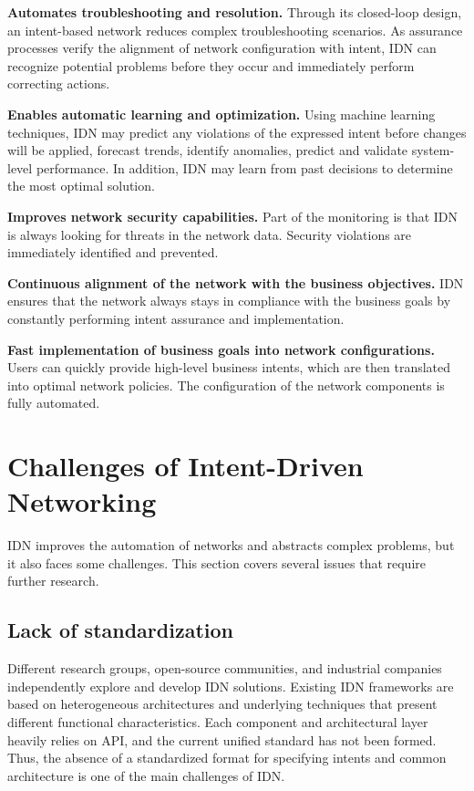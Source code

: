 \textbf{Automates troubleshooting and resolution.} Through its closed-loop design, an intent-based network reduces complex troubleshooting scenarios. As assurance processes verify the alignment of network configuration with intent, IDN can recognize potential problems before they occur and immediately perform correcting actions.

\textbf{Enables automatic learning and optimization.} Using machine learning techniques, IDN may predict any violations of the expressed intent before changes will be applied, forecast trends, identify anomalies, predict and validate system-level performance. In addition, IDN may learn from past decisions to determine the most optimal solution.

\textbf{Improves network security capabilities.} Part of the monitoring is that IDN is always looking for threats in the network data. Security violations are immediately identified and prevented.

\textbf{Continuous alignment of the network with the business objectives.} IDN ensures that the network always stays in compliance with the business goals by constantly performing intent assurance and implementation.

\textbf{Fast implementation of business goals into network configurations.} Users can quickly provide high-level business intents, which are then translated into optimal network policies. The configuration of the network components is fully automated.



\section{Challenges of Intent-Driven Networking}

IDN improves the automation of networks and abstracts complex problems, but it also faces some challenges. This section covers several issues that require further research.

\subsection{Lack of standardization}
Different research groups, open-source communities, and industrial companies independently explore and develop IDN solutions. Existing IDN frameworks are based on heterogeneous architectures and underlying techniques that present different functional characteristics. Each component and architectural layer heavily relies on API, and the current unified standard has not been formed. Thus, the absence of a standardized format for specifying intents and common architecture is one of the main challenges of IDN.\cite{8968429}

